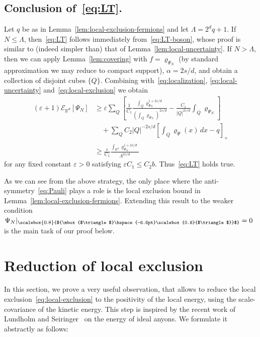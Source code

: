 \documentclass[AHL, Unicode, longabstracts, published]{cedram}
\newcommand*\eps{\varepsilon}
\newcommand*\R {\mathbb{R}}
\newcommand\1{{\ensuremath {\mathds 1} }}
\newcommand{\cE}{\mathcal{E}}
\newcommand{\bDelta}{{\mbox{$\triangle$}\hspace{-8.6pt}\scalebox{0.8}{$\triangle$}}}
\newcommand{\scriptbDelta}{\scalebox{0.8}{$\bDelta$}}
\begin{document}
\subsection*{Conclusion of~\eqref{eq:LT}.}
Let $q$ be as in Lemma~\ref{lem:local-exclusion-fermions} and let $\Lambda=2^d q+1$. If $N\le \Lambda$, then~\eqref{eq:LT} follows immediately from~\eqref{eq:LT-boson}, whose proof is similar to (indeed simpler than) that of Lemma~\ref{lem:local-uncertainty}. If $N> \Lambda$, then we can apply Lemma~\ref{lem:covering} with $f=\varrho_{\Psi_N}$ (by standard approximation we may reduce to compact support), $\alpha=2s/d$, and obtain a collection of disjoint cubes $\{Q\}$. Combining with~\eqref{eq:localization}, \eqref{eq:local-uncertainty} and~\eqref{eq:local-exclusion} we obtain
\begin{align*}
(\eps+1) \cE_{\R^d}[\Psi_N] &\ge \eps \sum_Q \left[\frac{1}{C_1}\frac{\int_Q \varrho_{\Psi_N}^{1+2s/d}}{\left(\int_Q \varrho_{\Psi_N} \right)^{2s/d}} - \frac{C_1}{|Q|^{2s/d}} \int_Q \varrho_{\Psi_N}\right] \\
& \quad + \sum_Q C_2 |Q|^{-2s/d} \left[\int_Q \varrho_\Psi(x)\,dx - q \right]_+ \\
&\ge \frac{\eps}{C_1} \frac{\int_{\R^d} \varrho_{\Psi_N}^{1+2s/d}}{\Lambda^{2s/d}}
\end{align*}
for any fixed constant $\eps>0$ satisfying $\eps C_1\le C_2 b$. Thus~\eqref{eq:LT} holds true.


As we can see from the above strategy, the only place where the anti-symmetry~\eqref{eq:Pauli} plays a role is the local exclusion bound in Lemma~\ref{lem:local-exclusion-fermions}. Extending this result to the weaker condition $\Psi_N\rvert_{\scriptbDelta}=0$ is the main task of our proof below.



\section{Reduction of local exclusion} \label{sec:reduction}
In this section, we prove a very useful observation, that allows to reduce the local exclusion~\eqref{eq:local-exclusion} to the positivity of the local energy, using the scale-covariance of the kinetic energy. This step is inspired by the recent work of Lundholm and Seiringer~\cite{LunSei-18} on the energy of ideal anyons. We formulate it abstractly as follows:
\end{document}
